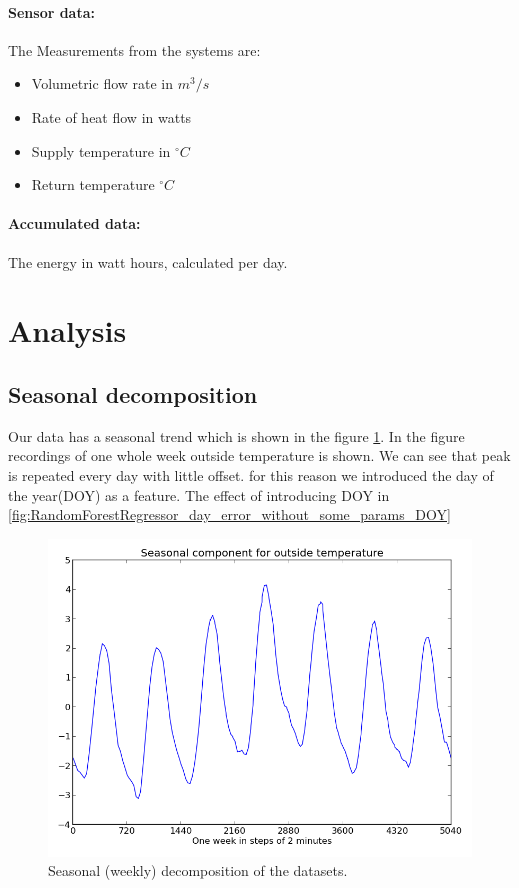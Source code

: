\documentclass{scrartcl}
\begin{document}
\paragraph{Sensor data:}
The Measurements from the systems are:

\begin{itemize}
\item Volumetric flow rate in $m^3 / s$
\item Rate of heat flow in watts
\item Supply temperature in $^\circ C$
\item Return temperature $^\circ C$
\end{itemize}

\paragraph{Accumulated data:}
The energy in watt hours, calculated per day.

\section{Analysis}
\label{sec:analysis}


\subsection{Seasonal decomposition}
Our data has a seasonal trend which is shown in the figure \ref{fig:season_outside_temperature}. In the figure recordings of one whole week outside temperature is shown. We can see that peak is repeated every day with little offset. for this reason we introduced the day of the year(DOY) as a feature. The effect of introducing DOY in \ref{fig:RandomForestRegressor_day_error_without_some_params_DOY} 
\begin{figure}[H]
  \center
  \includegraphics[width=0.6\linewidth]{img/season-outside_temperature.png}
  \caption{Seasonal (weekly) decomposition of the datasets.}
  \label{fig:season_outside_temperature}
\end{figure}
\end{document}
